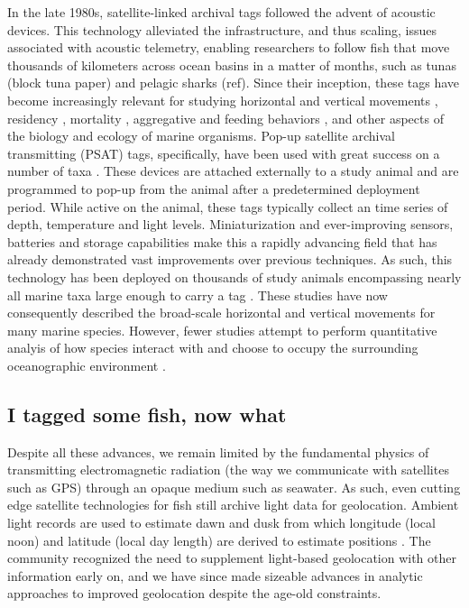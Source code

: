 In the late 1980s, satellite-linked archival tags followed the advent of acoustic devices. This technology alleviated the infrastructure, and thus scaling, issues associated with acoustic telemetry, enabling researchers to follow fish that move thousands of kilometers across ocean basins in a matter of months, such as tunas (block tuna paper) and pelagic sharks (ref). Since their inception, these tags have become increasingly relevant \citep{Hussey2015} for studying horizontal and vertical movements \citep{Block2011, Thorrold2014a, Berumen2014}, residency \citep{Domeier2006}, mortality \citep{Musyl2011a}, aggregative and feeding behaviors \citep{Jorgensen2012}, and other aspects of the biology and ecology of marine organisms. Pop-up satellite archival transmitting (PSAT) tags, specifically, have been used with great success on a number of taxa \citep{Hussey2015}. These devices are attached externally to a study animal and are programmed to pop-up from the animal after a predetermined deployment period. While active on the animal, these tags typically collect an \is time series of depth, temperature and light levels. Miniaturization and ever-improving sensors, batteries and storage capabilities make this a rapidly advancing field that has already demonstrated vast improvements over previous techniques. As such, this technology has been deployed on thousands of study animals encompassing nearly all marine taxa large enough to carry a tag \citep{Hussey2015}. These studies have now consequently described the broad-scale horizontal and vertical movements for many marine species. However, fewer studies attempt to perform quantitative analyis of how species interact with and choose to occupy the surrounding oceanographic environment \citep[except see, for example, ][]{Lawson2010}.

\subsection{I tagged some fish, now what}\label{sec:geo}
Despite all these advances, we remain limited by the fundamental physics of transmitting electromagnetic radiation (the way we communicate with satellites such as GPS) through an opaque medium such as seawater. As such, even cutting edge satellite technologies for fish still archive light data for geolocation. Ambient light records are used to estimate dawn and dusk from which longitude (local noon) and latitude (local day length) are derived to estimate positions \citep{Hill1994, Hill2001}. The community recognized the need to supplement light-based geolocation with other information early on, and we have since made sizeable advances in analytic approaches to improved geolocation despite the age-old constraints. 

